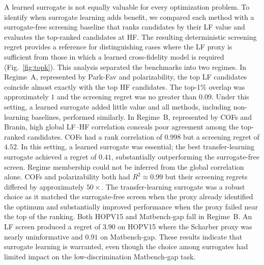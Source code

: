 \documentclass[11pt,a4paper]{article}%
\begin{document}
A learned surrogate is not equally valuable for every optimization problem. To identify when surrogate learning adds benefit, we compared each method with a surrogate-free screening baseline that ranks candidates by their LF
value and evaluates the top-ranked candidates at HF. The resulting deterministic screening
regret provides a reference for distinguishing cases where the LF proxy is sufficient from those in which a learned cross-fidelity model is required
(Fig.~\ref{fig:topk}). This analysis separated the benchmarks into two regimes. In Regime~A, represented by Park-Fav and polarizability, the top LF
candidates coincide almost exactly with the top HF candidates. The top-1\% overlap was approximately $1$ and the screening regret was no greater than $ 0.09$. Under this setting, a learned surrogate added little value and all
methods, including non-learning baselines, performed similarly. In Regime~B, represented by COFs and
Branin, high global LF--HF correlation conceals poor agreement among the top-ranked  candidates. COFs had a
rank correlation of $0.998$ but a screening regret of $4.52$. In this setting, a learned surrogate was
essential; the best transfer-learning surrogate achieved a regret of $0.41$, substantially outperforming the surrogate-free screen. Regime membership could not be inferred from the global correlation alone. COFs and
polarizability both had $R^2 \approx 0.99$ but their screening regrets differed by approximately
$50\times$. The
transfer-learning surrogate was a robust choice as it matched the surrogate-free screen when the proxy already identified the optimum and substantially improved performance when the proxy failed near the top of the ranking. Both HOPV15 and Matbench-gap fall in
Regime~B. An LF screen produced a regret of $3.90$ on HOPV15 where the Scharber proxy
was nearly uninformative and $0.91$ on Matbench-gap. These results indicate that  surrogate learning is warranted,
even though the choice among surrogates had limited impact on the
low-discrimination Matbench-gap task.
\end{document}
